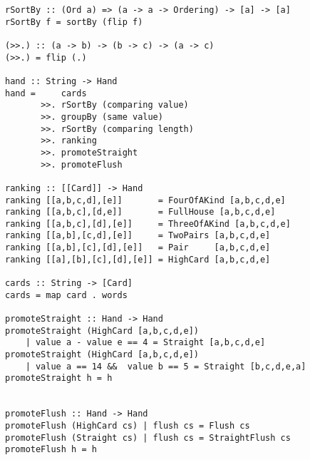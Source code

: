 \lhN
\hspace*{\fill} 
\lhA
\begin{lstlisting}[frame=single]
rSortBy :: (Ord a) => (a -> a -> Ordering) -> [a] -> [a]
rSortBy f = sortBy (flip f)

(>>.) :: (a -> b) -> (b -> c) -> (a -> c)
(>>.) = flip (.)

hand :: String -> Hand
hand =     cards
       >>. rSortBy (comparing value)
       >>. groupBy (same value)
       >>. rSortBy (comparing length)
       >>. ranking 
       >>. promoteStraight
       >>. promoteFlush    

ranking :: [[Card]] -> Hand
ranking [[a,b,c,d],[e]]       = FourOfAKind [a,b,c,d,e]
ranking [[a,b,c],[d,e]]       = FullHouse [a,b,c,d,e]
ranking [[a,b,c],[d],[e]]     = ThreeOfAKind [a,b,c,d,e]
ranking [[a,b],[c,d],[e]]     = TwoPairs [a,b,c,d,e]
ranking [[a,b],[c],[d],[e]]   = Pair     [a,b,c,d,e]
ranking [[a],[b],[c],[d],[e]] = HighCard [a,b,c,d,e] 

cards :: String -> [Card]
cards = map card . words 

promoteStraight :: Hand -> Hand
promoteStraight (HighCard [a,b,c,d,e]) 
    | value a - value e == 4 = Straight [a,b,c,d,e]
promoteStraight (HighCard [a,b,c,d,e]) 
    | value a == 14 &&  value b == 5 = Straight [b,c,d,e,a]
promoteStraight h = h


promoteFlush :: Hand -> Hand
promoteFlush (HighCard cs) | flush cs = Flush cs
promoteFlush (Straight cs) | flush cs = StraightFlush cs
promoteFlush h = h
\end{lstlisting}
\lhend

